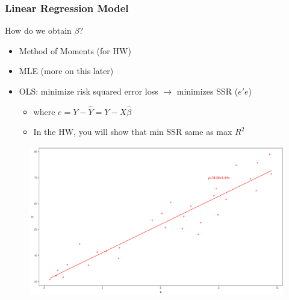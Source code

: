 \documentclass[
  shownotes,
  xcolor={svgnames},
  hyperref={colorlinks,citecolor=DarkBlue,linkcolor=DarkRed,urlcolor=DarkBlue}
  , aspectratio=169]{beamer}
\begin{document}
\begin{frame}
\frametitle{Linear Regression Model}

How do we obtain $\beta$?

\begin{itemize}
  \footnotesize
  \item Method of Moments {\tiny (for HW)}
  \item MLE {\tiny (more on this later)}
  \item OLS: minimize risk squared error loss $\rightarrow$ minimizes SSR ($e'e$) 
  \begin{itemize}
    \tiny
  \item where $e=Y-\hat Y=Y-X\hat\beta$
  \item In the HW, you will show that min SSR same as max $R^2$
  \end{itemize}  
\end{itemize}
\bigskip



\bigskip
\begin{figure}[H] \centering
  \centering
  \includegraphics[scale=0.22]{figures/fig_1b.pdf}
  \\
  \tiny
\end{figure}

\end{frame}
\end{document}
